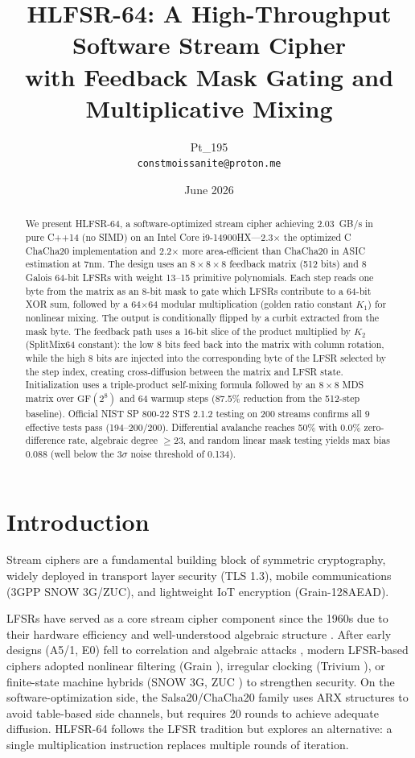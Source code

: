\documentclass[11pt,a4paper]{article}
\title{HLFSR-64: A High-Throughput Software Stream Cipher\\with Feedback Mask Gating and Multiplicative Mixing}
\author{Pt\_195\\[2mm]
\small \texttt{constmoissanite@proton.me}}
\date{June 2026}
\begin{document}
\maketitle

\begin{abstract}
We present HLFSR-64, a software-optimized stream cipher achieving 2.03~GB/s in
pure C++14 (no SIMD) on an Intel Core i9-14900HX---2.3$\times$ the optimized C
ChaCha20 implementation and 2.2$\times$ more area-efficient than ChaCha20 in
ASIC estimation at 7nm. The design uses an $8{\times}8{\times}8$ feedback matrix
(512 bits) and 8 Galois 64-bit LFSRs with weight 13--15 primitive polynomials.
Each step reads one byte from the matrix as an 8-bit mask to gate which LFSRs
contribute to a 64-bit XOR sum, followed by a 64$\times$64 modular
multiplication (golden ratio constant $K_1$) for nonlinear mixing. The output is
conditionally flipped by a curbit extracted from the mask byte. The feedback
path uses a 16-bit slice of the product multiplied by $K_2$ (SplitMix64
constant): the low 8 bits feed back into the matrix with column rotation, while
the high 8 bits are injected into the corresponding byte of the LFSR selected
by the step index, creating cross-diffusion between the matrix and LFSR state.
Initialization uses a triple-product self-mixing formula followed by an
$8{\times}8$ MDS matrix over $\mathrm{GF}(2^8)$ and 64 warmup steps (87.5\%
reduction from the 512-step baseline). Official NIST SP 800-22 STS 2.1.2
testing on 200 streams confirms all 9 effective tests pass (194--200/200).
Differential avalanche reaches 50\% with 0.0\% zero-difference rate, algebraic
degree $\ge 23$, and random linear mask testing yields max bias 0.088 (well
below the $3\sigma$ noise threshold of 0.134).
\end{abstract}

\section{Introduction}

Stream ciphers are a fundamental building block of symmetric cryptography,
widely deployed in transport layer security (TLS 1.3), mobile communications
(3GPP SNOW 3G/ZUC), and lightweight IoT encryption (Grain-128AEAD).

LFSRs have served as a core stream cipher component since the 1960s due to their
hardware efficiency and well-understood algebraic structure \cite{golomb}. After
early designs (A5/1, E0) fell to correlation \cite{golic} and algebraic attacks
\cite{courtois}, modern LFSR-based ciphers adopted nonlinear filtering (Grain
\cite{grain}), irregular clocking (Trivium \cite{trivium}), or finite-state
machine hybrids (SNOW 3G, ZUC \cite{etsi-snow}) to strengthen security. On the
software-optimization side, the Salsa20/ChaCha20 family \cite{chacha} uses ARX
structures to avoid table-based side channels, but requires 20 rounds to achieve
adequate diffusion. HLFSR-64 follows the LFSR tradition but explores an
alternative: a single multiplication instruction replaces multiple rounds of
iteration.
\end{document}
